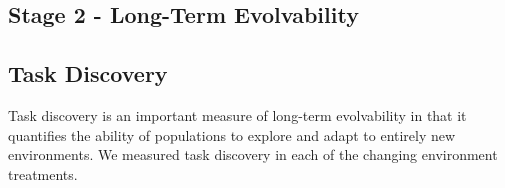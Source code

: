 \documentclass[10pt,letterpaper]{article}
\begin{document}

\subsection*{Stage 2 - Long-Term Evolvability}
\subsection*{Task Discovery}
Task discovery is an important measure of long-term evolvability in that it quantifies the ability of populations to explore and adapt to entirely new environments. We measured task discovery in each of the changing environment treatments.
\end{document}
